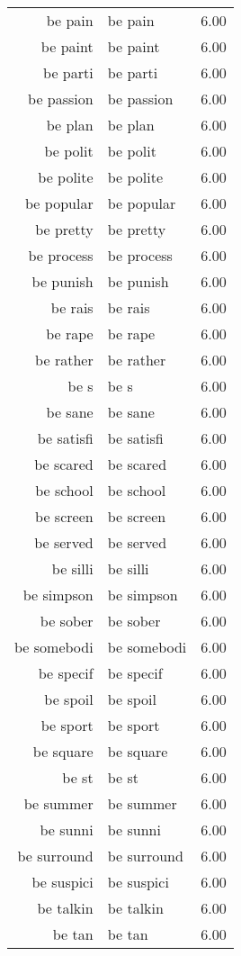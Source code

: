 \begin{table}[ht]
\begin{tabular}{rlr}
  be pain & be pain & 6.00 \\ 
  be paint & be paint & 6.00 \\ 
  be parti & be parti & 6.00 \\ 
  be passion & be passion & 6.00 \\ 
  be plan & be plan & 6.00 \\ 
  be polit & be polit & 6.00 \\ 
  be polite & be polite & 6.00 \\ 
  be popular & be popular & 6.00 \\ 
  be pretty & be pretty & 6.00 \\ 
  be process & be process & 6.00 \\ 
  be punish & be punish & 6.00 \\ 
  be rais & be rais & 6.00 \\ 
  be rape & be rape & 6.00 \\ 
  be rather & be rather & 6.00 \\ 
  be s & be s & 6.00 \\ 
  be sane & be sane & 6.00 \\ 
  be satisfi & be satisfi & 6.00 \\ 
  be scared & be scared & 6.00 \\ 
  be school & be school & 6.00 \\ 
  be screen & be screen & 6.00 \\ 
  be served & be served & 6.00 \\ 
  be silli & be silli & 6.00 \\ 
  be simpson & be simpson & 6.00 \\ 
  be sober & be sober & 6.00 \\ 
  be somebodi & be somebodi & 6.00 \\ 
  be specif & be specif & 6.00 \\ 
  be spoil & be spoil & 6.00 \\ 
  be sport & be sport & 6.00 \\ 
  be square & be square & 6.00 \\ 
  be st & be st & 6.00 \\ 
  be summer & be summer & 6.00 \\ 
  be sunni & be sunni & 6.00 \\ 
  be surround & be surround & 6.00 \\ 
  be suspici & be suspici & 6.00 \\ 
  be talkin & be talkin & 6.00 \\ 
  be tan & be tan & 6.00 \\ 

\end{tabular}
\end{table}
